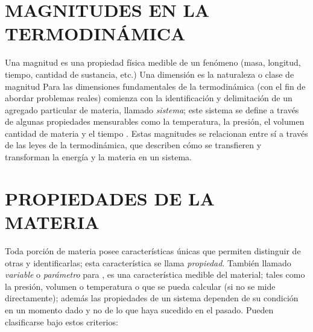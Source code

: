

  \section{MAGNITUDES EN LA TERMODINÁMICA} %
    Una magnitud es una propiedad física medible de un fenómeno (masa, longitud, tiempo, cantidad de sustancia, etc.) 
    Una dimensión es la naturaleza o clase de magnitud
    Para \parencite{bib:thermo:VanNess} las dimensiones fundamentales de la termodinámica (con el fin de abordar problemas reales) comienza con la identificación y delimitación de un agregado particular de materia, llamado \textit{sistema}; este sistema se define a través de algunas propiedades { \color{red} mensurables como la temperatura, la presión, el volumen cantidad de materia y el tiempo }. Estas magnitudes se relacionan entre sí a través de las leyes de la termodinámica, que describen cómo se transfieren y transforman la energía y la materia en un sistema. 

\section{PROPIEDADES DE LA MATERIA}
  Toda porción de materia posee características únicas que permiten distinguir de otras y identificarlas; esta característica se llama \textit{propiedad}. También llamado \textit{variable} o \textit{parámetro} para \parencite{bib:Himmelblau1997}, es una característica medible del material; tales como la presión, volumen o temperatura o que se pueda calcular (si no se mide directamente); además las propiedades de un sistema dependen de su condición en un momento dado y no de lo que haya sucedido en el pasado. Pueden clasificarse bajo estos criterios:

